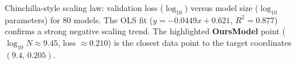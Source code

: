 \caption{Chinchilla-style scaling law: validation loss ($\log_{10}$) versus model size ($\log_{10}$ parameters) for 80 models. The OLS fit ($y = -0.0449x + 0.621$, $R^2 = 0.877$) confirms a strong negative scaling trend. The highlighted \textbf{OursModel} point ($\log_{10}N \approx 9.45$, loss $\approx 0.210$) is the closest data point to the target coordinates $(9.4,\,0.205)$.}
